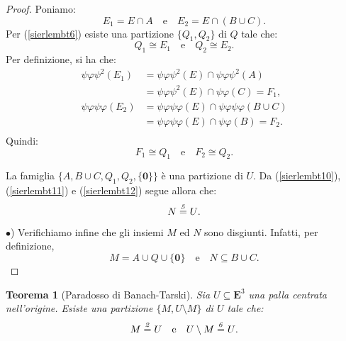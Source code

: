 \documentclass[a4paper,oneside,11pt]{book}
\theoremstyle{definition} \newtheorem{Def}{Definizione}
\theoremstyle{plain} \newtheorem{teo}{Teorema}
\theoremstyle{plain} \newtheorem{cor}[teo]{Corollario}
\theoremstyle{definition} \newtheorem{lem}[teo]{Lemma}
\theoremstyle{plain} \newtheorem{pro}[teo]{Proposizione}
\newcommand{\ug}[1]{(\ref{#1})} %
\newcommand{\eqn}[1]{\stackrel{\text{\textit{#1}}}{=}}
\begin{document}
\begin{proof}
		Poniamo:
		\begin{equation*}
			E_1 = E \cap A \quad \text{e} \quad E_2 = E \cap (B \cup C) \text{.} 
		\end{equation*}
		Per \ug{sierlembt6} esiste una partizione $\{Q_1, Q_2\}$ di $Q$ tale che:
		\begin{equation*}
			Q_1 \cong E_1 \quad \text{e} \quad Q_2 \cong E_2 \text{.} 
		\end{equation*}
		Per definizione, si ha che:
		\begin{equation*}
			\begin{aligned}
				\psi\varphi\psi^2(E_1) &= \psi\varphi\psi^2(E) \cap \psi\varphi\psi^2(A)\\
				&= \psi\varphi\psi^2(E) \cap \psi\varphi(C) = F_1 \text{,} \\
				\psi\varphi\psi\varphi(E_2) &= \psi\varphi\psi\varphi(E) \cap \psi\varphi\psi\varphi(B \cup C)\\
				&= \psi\varphi\psi\varphi(E) \cap \psi\varphi(B) = F_2 \text{.} \\
			\end{aligned}
		\end{equation*}
		Quindi:
		\begin{equation}\label{sierlembt12}
			F_1 \cong Q_1 \quad  \text{e} \quad F_2 \cong Q_2 \text{.} 
		\end{equation}
		
		La famiglia $\{A, B \cup C, Q_1, Q_2, \{\mathbf{0}\}\}$ è una partizione di $U$. Da \ug{sierlembt10}, \ug{sierlembt11} e \ug{sierlembt12} segue allora che:
		\begin{equation*}
			N \eqn{5} U \text{.}
		\end{equation*}
		
		$\bullet$) Verifichiamo infine che gli insiemi $M$ ed $N$ sono disgiunti. Infatti, per definizione,
		\begin{equation*}
			M = A \cup Q \cup \{\mathbf{0}\} \quad  \text{e} \quad N \subseteq B \cup C \text{.}
		\end{equation*}
	\end{proof}
	
	\begin{teo}[Paradosso di Banach-Tarski]\label{parbantar}
		Sia $U \subseteq \mathbf{E}^3$ una palla centrata nell'origine. Esiste una partizione $\{M, U \setminus M\}$ di $U$ tale che:
		\begin{equation*}
			M \eqn{2} U \quad  \text{e} \quad U \setminus M \eqn{6} U \text{.}
		\end{equation*}
	\end{teo}
	
\end{document}
